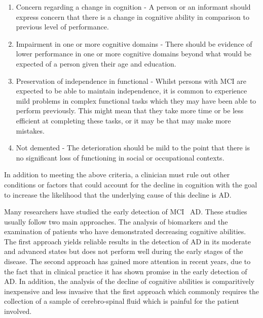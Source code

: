 \documentclass{article}
\begin{document}
\begin{enumerate}
	\item Concern regarding a change in cognition - A person or an informant should express concern that there is a change in cognitive ability in comparison to previous level of performance.
	\item Impairment in one or more cognitive domains - There should be evidence of lower performance in one or more cognitive domains beyond what would be expected of a person given their age and education. 
	\item Preservation of independence in functional - Whilst persons with MCI are expected to be able to maintain independence, it is common to experience mild problems in complex functional tasks which they may have been able to perform previously. This might mean that they take more time or be less efficient at completing these tasks, or it may be that may make more mistakes.
	\item Not demented - The deterioration should be mild to the point that there is no significant loss of functioning in social or occupational contexts.
\end{enumerate}
In addition to meeting the above criteria, a clinician must rule out other conditions or factors that could account for the decline in cognition with the goal to increase the likelihood that the underlying cause of this decline is AD. 
\par 
Many researchers have studied the early detection of MCI \ AD. These studies usually follow two main approaches. The analysis of biomarkers and the examination of patients who have demonstrated decreasing cognitive abilities. The first approach yields reliable results in the detection of AD in its moderate and advanced states but does not perform well during the early stages of the disease. The second approach has gained more attention in recent years, due to the fact that in clinical practice it has shown promise in the early detection of AD. In addition, the analysis of the decline of cognitive abilities is comparitively inexpensive and less invasive that the first approach which commonly requires the collection of a sample of cerebro-spinal fluid which is painful for the patient involved. 
\par
\end{document}
